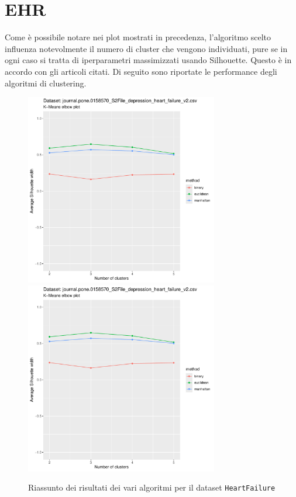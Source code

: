 \documentclass[a4paper, 12pt]{report}
\begin{document}
		\section{EHR}

			Come è possibile notare nei plot mostrati in precedenza,
			l'algoritmo scelto influenza notevolmente il numero di
			cluster che vengono individuati, pure se in ogni caso si
			tratta di iperparametri massimizzati usando Silhouette.
			Questo è in accordo con gli articoli citati. Di seguito
			sono riportate le performance degli algoritmi di clustering.

			\begin{figure}[H]
				\centering
				\includegraphics[width = 0.75\textwidth, height = 0.45\textheight, page = 9]{
					results/results_HeartFailure.csv.pdf
				}
				\includegraphics[width = 0.75\textwidth, height = 0.45\textheight, page = 10]{
					results/results_HeartFailure.csv.pdf
				}
				\caption{Riassunto dei risultati dei vari algoritmi per il dataset
				\texttt{HeartFailure}}
				\label{fig:comp1}
			\end{figure}
\end{document}
